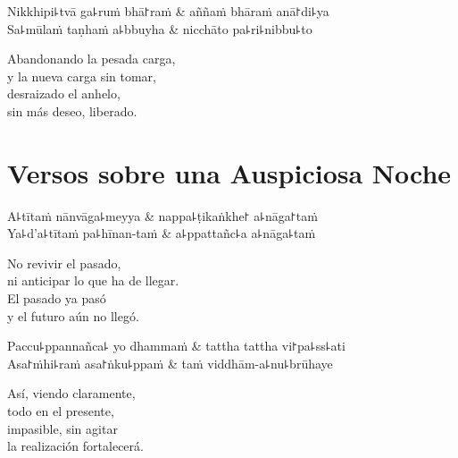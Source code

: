 \begin{twochants}
Nikkhipi꜕tvā ga꜕ruṁ bhā꜓raṁ & aññaṁ bhāraṁ anā꜓di꜕ya \\
Sa꜕mūlaṁ taṇhaṁ a꜕bbuyha & nicchāto pa꜕ri꜕nibbu꜕to \\
\end{twochants}

\begin{english}
  Abandonando la pesada carga,\\
  y la nueva carga sin tomar,\\
  desraizado el anhelo,\\
  sin más deseo, liberado.
\end{english}

\chapter{Versos sobre una Auspiciosa Noche}


\begin{leader}
\end{leader}

\begin{twochants}
  A꜕tītaṁ nānvāga꜕meyya & nappa꜕ṭikaṅkhe꜓ a꜕nāga꜓taṁ \\
  Ya꜕d'a꜕tītaṁ pa꜕hīnan-taṁ & a꜕ppattañc꜕a a꜕nāga꜕taṁ \\
\end{twochants}

\begin{english}
  No revivir el pasado,\\
  ni anticipar lo que ha de llegar.\\
  El pasado ya pasó\\
  y el futuro aún no llegó.
\end{english}

\begin{twochants}
  Paccu꜕ppannañca꜕ yo dhammaṁ & tattha tattha vi꜓pa꜕ss꜕ati \\
  Asa꜓ṁhi꜕raṁ asa꜓ṅku꜕ppaṁ & taṁ viddhām-a꜕nu꜕brūhaye \\
\end{twochants}

\begin{english}
  Así, viendo claramente,\\
  todo en el presente,\\
  impasible, sin agitar\\
  la realización fortalecerá.
\end{english}

